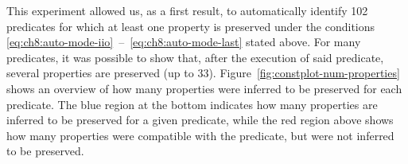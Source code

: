 \documentclass[11pt]{article}
\begin{document}
This experiment allowed us, as a  first result, to automatically identify 102
predicates for which at least one  property is preserved under the conditions
\ref{eq:ch8:auto-mode-iio}~--~\ref{eq:ch8:auto-mode-last} stated  above.  For
many predicates,  it was possible to  show that, after the  execution of said
predicate,   several   properties   are    preserved   (up   to   33).    
Figure~\ref{fig:constplot-num-properties}  shows  an  overview  of  how  many
properties were inferred to be preserved  for each predicate. The blue region
at the bottom indicates how many  properties are inferred to be preserved for
a given predicate, while the red  region above shows how many properties were
compatible with the predicate, but were not inferred to be preserved.

\begin{figure}[ht]
  \centering
\end{figure}
\end{document}
